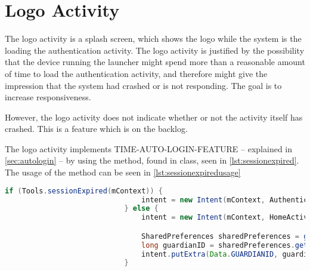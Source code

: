 \section{Logo Activity}
The logo activity is a splash screen, which shows the \giraf[] logo while the system is the loading the authentication activity. The logo activity is justified by the possibility that the device running the launcher might spend more than a reasonable amount of time to load the authentication activity, and therefore might give the impression that the system had crashed or is not responding. The goal is to increase responsiveness. 

However, the logo activity does not indicate whether or not the activity itself has crashed. This is a feature which is on the backlog. 

The logo activity implements TIME-AUTO-LOGIN-FEATURE -- explained in \autoref{sec:autologin} -- by using the  method, found in  class, seen in \autoref{lst:sessionexpired}. The usage of the  method can be seen in \autoref{lst:sessionexpiredusage}

\begin{lstlisting}[style=sourceCode, language=JAVA, caption=LogoActivity.java, label=lst:sessionexpiredusage] 
		if (Tools.sessionExpired(mContext)) {
			            		intent = new Intent(mContext, AuthenticationActivity.class);
			            	} else {
			            		intent = new Intent(mContext, HomeActivity.class);

			            		SharedPreferences sharedPreferences = getSharedPreferences(Data.TIMERKEY, 0);
			            		long guardianID = sharedPreferences.getLong(Data.GUARDIANID, -1);
		            			intent.putExtra(Data.GUARDIANID, guardianID);
			            	}
\end{lstlisting}

